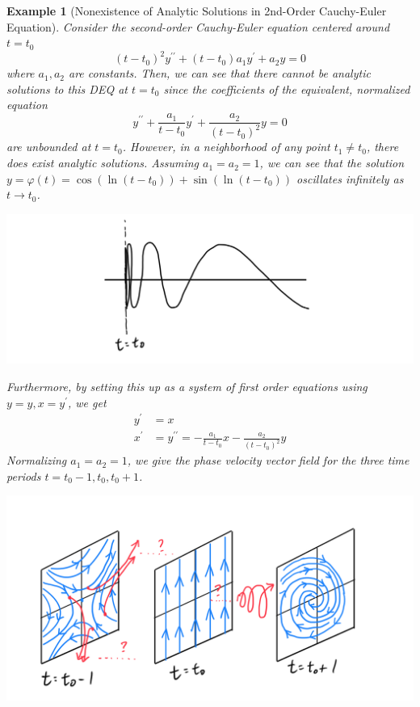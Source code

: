 \documentclass{article}
\newtheorem{example}{Example}[section]
\theoremstyle{remark}
\theoremstyle{definition}
\begin{document}
\begin{example}[Nonexistence of Analytic Solutions in 2nd-Order Cauchy-Euler Equation]
Consider the second-order Cauchy-Euler equation centered around $t = t_0$
\[(t - t_0)^2 y^{\prime\prime} + (t - t_0) a_1 y^\prime + a_2 y = 0\]
where $a_1, a_2$ are constants. Then, we can see that there cannot be analytic solutions to this DEQ at $t= t_0$ since the coefficients of the equivalent, normalized equation
\[y^{\prime\prime} + \frac{a_1}{t - t_0} y^\prime + \frac{a_2}{(t-t_0)^2} y = 0\]
are unbounded at $t = t_0$. However, in a neighborhood of any point $t_1 \neq t_0$, there does exist analytic solutions. Assuming $a_1 = a_2 = 1$, we can see that the solution $y = \varphi(t) = \cos(\ln{(t-t_0)}) + \sin(\ln{(t - t_0)})$ oscillates infinitely as $t \rightarrow t_0$. 
\begin{center}
    \includegraphics[scale=0.25]{img/Oscillates_Infinitely.PNG}
\end{center}
Furthermore, by setting this up as a system of first order equations using $y = y, x = y^\prime$, we get
\begin{align*}
    y^\prime & = x \\
    x^{\prime} & = y^{\prime\prime} = - \frac{a_1}{t - t_0} x - \frac{a_2}{(t - t_0)^2} y
\end{align*}
Normalizing $a_1 = a_2 = 1$, we give the phase velocity vector field for the three time periods $t = t_0 - 1, t_0, t_0 + 1$. 
\begin{center}
    \includegraphics[scale=0.25]{img/Singular_Point_of_2nd_Cauchy_Euler.PNG}
\end{center}
\end{example}
\end{document}
